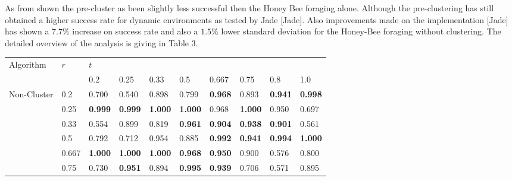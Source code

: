 \documentclass[12pt]{article}
\begin{document}
\par{As from shown the pre-cluster as been slightly less successful then the Honey Bee foraging alone. Although the pre-clustering has still obtained a higher success rate for dynamic environments as tested by Jade [Jade]. Also improvements made on the implementation [Jade] has shown a $7.7\%$ increase on success rate and also a $1.5\%$ lower standard deviation for the Honey-Bee foraging without clustering. The detailed overview of the analysis is giving in Table 3. }
\\
\begin{table}[h]
\centering
\begin{tabular}{|l|l|l|l|l|l|l|l|l|l|}
\hline
\multirow{2}{*}{Algorithm}                         & \multirow{2}{*}{\hspace{0.017\linewidth}$r$} & \multicolumn{8}{l|}{\hspace{0.28\linewidth} $t$}                                                                                        \\ \cline{3-10} 
                                                   &                    & 0.2         & 0.25        & 0.33        & 0.5         & 0.667       & 0.75        & 0.8         & 1.0         \\ \hline
\multirow{8}{*}{Non-Cluster}                       & 0.2                & 0.700       & 0.540       & 0.898       & 0.799       & {\bf 0.968} & 0.893       & {\bf 0.941} & {\bf 0.998} \\
                                                   & 0.25               & {\bf 0.999} & {\bf 0.999} & {\bf 1.000}   & {\bf 1.000}   & 0.968       & {\bf 1.000}   & 0.950       & 0.697       \\
                                                   & 0.33               & 0.554       & 0.899       & 0.819       & {\bf 0.961} & {\bf 0.904} & {\bf 0.938} & {\bf 0.901} & 0.561       \\
                                                   & 0.5                & 0.792       & 0.712       & 0.954       & 0.885       & {\bf 0.992} & {\bf 0.941} & {\bf 0.994} & {\bf 1.000}   \\
                                                   & 0.667              & {\bf 1.000}   & {\bf 1.000}   & {\bf 1.000}   & {\bf 0.968} & {\bf 0.950} & 0.900       & 0.576       & 0.800       \\
                                                   & 0.75               & 0.730       & {\bf 0.951} & 0.894       & {\bf 0.995} & {\bf 0.939} & 0.706       & 0.571       & 0.895       \\

\end{tabular}
\end{table}
\end{document}
